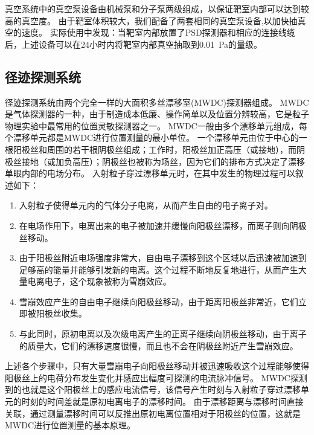 真空系统中的真空泵设备由机械泵和分子泵两级组成，以保证靶室内部可以达到较高的真空度。
由于靶室体积较大，我们配备了两套相同的真空泵设备,以加快抽真空的速度。
实际使用中发现：当靶室内部放置了PSD探测器和相应的连接线缆后，上述设备可以在24小时内将靶室内部真空抽取到\SI{0.01}{Pa}的量级。

\subsection{径迹探测系统}
\label{sec:cosmic_ray:tracking_system}
径迹探测系统由两个完全一样的大面积多丝漂移室(MWDC)探测器组成。
MWDC是气体探测器的一种，由于制造成本低廉、操作简单以及位置分辨较高，它是粒子物理实验中最常用的位置灵敏探测器之一。
MWDC一般由多个漂移单元组成，每个漂移单元都是MWDC进行位置测量的最小单位。
一个漂移单元由位于中心的一根阳极丝和周围的若干根阴极丝组成；工作时，阳极丝加正高压（或接地），而阴极丝接地（或加负高压）；阴极丝也被称为场丝，因为它们的排布方式决定了漂移单眼内部的电场分布。
入射粒子穿过漂移单元时，在其中发生的物理过程可以叙述如下：
\begin{enumerate}
	\item 入射粒子使得单元内的气体分子电离，从而产生自由的电子离子对。
	\item 在电场作用下，电离出来的电子被加速并缓慢向阳极丝漂移，而离子则向阴极丝移动。
	\item 由于阳极丝附近电场强度非常大，自由电子漂移到这个区域以后迅速被加速到足够高的能量并能够引发新的电离。这个过程不断地反复地进行，从而产生大量电离电子，这个现象被称为雪崩效应。
	\item 雪崩效应产生的自由电子继续向阳极丝移动，由于距离阳极丝非常近，它们立即被阳极丝收集。
	\item 与此同时，原初电离以及次级电离产生的正离子继续向阴极丝移动，由于离子的质量大，它们的漂移速度很慢，而且也不会在阴极丝附近产生雪崩效应。
\end{enumerate}
上述各个步骤中，只有大量雪崩电子向阳极丝移动并被迅速吸收这个过程能够使得阳极丝上的电荷分布发生变化并感应出幅度可探测的电流脉冲信号。
MWDC探测到的也就是这个阳极丝上的感应电流信号，该信号产生时刻与入射粒子穿过漂移单元的时刻的时间差就是原初电离电子的漂移时间。
由于漂移距离与漂移时间直接关联，通过测量漂移时间可以反推出原初电离位置相对于阳极丝的位置，这就是MWDC进行位置测量的基本原理。


